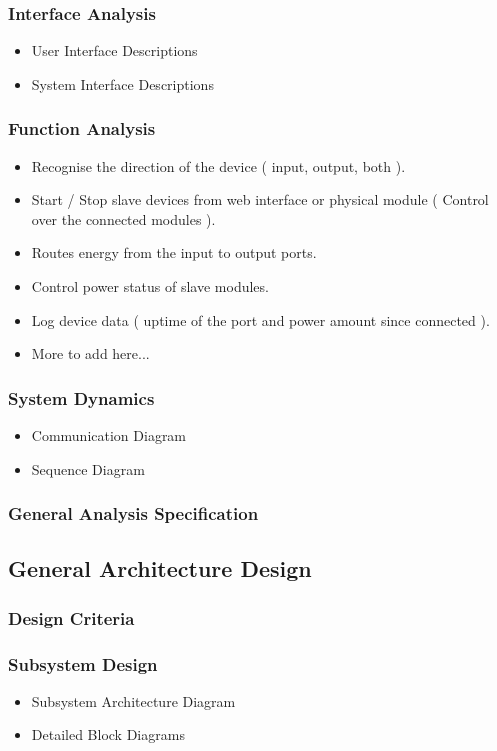 	\subsubsection{Interface Analysis}
		\begin{itemize}
			\item User Interface Descriptions
			\item System Interface Descriptions
		\end{itemize}
	\subsubsection{Function Analysis}
		\begin{itemize}
			\item Recognise the direction of the device ( input, output, both ).
			\item Start / Stop slave devices from web interface or physical module ( Control over the connected modules ).
			\item Routes energy from the input to output ports.
			\item Control power status of slave modules.
			\item Log device data ( uptime of the port and power amount since connected ).
			\item More to add here...
		\end{itemize}
	\subsubsection{System Dynamics}
		\begin{itemize}
			\item Communication Diagram
			\item Sequence Diagram
		\end{itemize}
	\subsubsection{General Analysis Specification}
\subsection{General Architecture Design}
	\subsubsection{Design Criteria}
	\subsubsection{Subsystem Design}
		\begin{itemize}
			\item Subsystem Architecture Diagram
			\item Detailed Block Diagrams
		\end{itemize}
